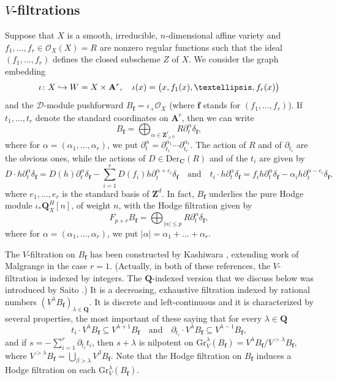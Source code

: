 \documentclass[11pt]{article}
\numberwithin{equation}{section}
\newcommand\hto{\mathrel{\lhook\joinrel\to}}
\theoremstyle{plain}
\theoremstyle{definition}
\newcommand\A{{\mathbf A}}
\newcommand\Z{{\mathbf Z}}
\newcommand\Q{{\mathbf Q}}
\newcommand\C{{\mathbf C}}
\newcommand\cD{\mathcal{D}}
\newcommand\cO{\mathcal{O}}
\newcommand\cO{\mathcal{O}}
\newcommand\bff{{\boldsymbol f}}
\newcommand\gr{\mathrm{Gr}}
\begin{document}
\subsection{$V$-filtrations}\label{section_V_filtration} Suppose that $X$ is a smooth, irreducible, $n$-dimensional affine variety and $f_1,\ldots,f_r\in\cO_X(X)=R$ are nonzero regular functions such that the ideal
$(f_1,\ldots,f_r)$ defines the closed subscheme $Z$ of $X$. We consider the graph embedding
\[\iota\colon X\hto W=X\times\A^r,\quad \iota(x)=\big(x,f_1(x),\ldots,f_r(x)\big)\]
and the $\cD$-module pushforward $B_{\bff}=\iota_+\cO_X$ (where $\bff$ stands for $(f_1,\ldots,f_r)$). If~$t_1,\ldots,t_r$ denote the standard coordinates on
$\A^r$, then we can write
\[B_{\bff}=\bigoplus_{\alpha\in \Z_{\geq 0}^r}R\partial_t^{\alpha}\delta_{\bff},\]
where for $\alpha=(\alpha_1,\ldots,\alpha_r)$, we put $\partial_t^{\alpha}=\partial_{t_1}^{\alpha_1}\cdots \partial_{t_r}^{\alpha_r}$.
The action of $R$ and of $\partial_{t_i}$ are the obvious ones, while the actions of $D\in \mathrm{Der}_{\C}(R)$ and of the $t_i$ are given by
\[D\cdot h\partial_t^{\alpha}\delta_{\bff}=D(h)\partial_t^{\alpha}\delta_{\bff}-\sum_{i=1}^rD(f_i)h\partial_t^{\alpha+e_i}\delta_{\bff}\quad\text{and}\quad
t_i\cdot h\partial_t^{\alpha}\delta_{\bff}=f_ih\partial_t^{\alpha}\delta_{\bff}-\alpha_ih\partial_t^{\alpha-e_i}\delta_{\bff},\]
where $e_1,\ldots,e_r$ is the standard basis of $\Z^d$. In fact, $B_{\bff}$ underlies the pure Hodge module $\iota_*\Q_X^H[n]$, of weight $n$,
with the Hodge filtration given by
\[F_{p+r}B_{\bff}=\bigoplus_{|\alpha|\leq p}R\partial_t^{\alpha}\delta_{\bff},\]
where for $\alpha=(\alpha_1,\ldots,\alpha_r)$, we put $|\alpha|=\alpha_1+\ldots+\alpha_r$.

The $V$-filtration on $B_{\bff}$ has been constructed by Kashiwara \cite{Kashiwara}, extending work of Malgrange \cite{Malgrange} in the case $r=1$.
(Actually, in both of these references, the $V$-filtration is indexed by integers. The $\Q$-indexed version that we discuss below was introduced by Saito \cite{Saito_GM}.)
It is a decreasing, exhaustive filtration indexed by rational numbers $(V^{\lambda}B_{\bff})_{\lambda\in\Q}$. It is discrete and left-continuous and
it is characterized by several properties, the most important of these saying that for every $\lambda\in\Q$
\[t_i\cdot V^{\lambda}B_{\bff}\subseteq V^{\lambda+1}B_{\bff}\quad\text{and}\quad \partial_{t_i}\cdot V^{\lambda}B_{\bff}\subseteq V^{\lambda-1}B_{\bff},\]
and if $s=-\sum_{i=1}^r\partial_{t_i}t_i$, then $s+\lambda$ is nilpotent on $\gr^{\lambda}_V(B_{\bff})=V^{\lambda}B_{\bff}/V^{>\lambda}B_{\bff}$,
where $V^{>\lambda}B_{\bff}=\bigcup_{\beta>\lambda}V^{\beta}B_{\bff}$. Note that the Hodge filtration on $B_{\bff}$ induces a Hodge filtration
on each $\gr_V^{\lambda}(B_{\bff})$.
\end{document}
